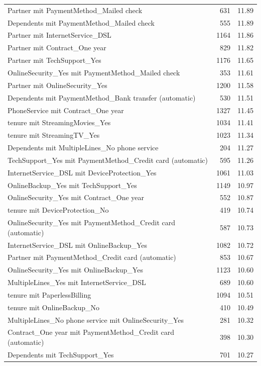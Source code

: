 \documentclass[a4paper,11pt]{article}
\begin{document}
\begin{longtable}{p{9cm}rr}
Partner mit PaymentMethod\_Mailed check & 631 & 11.89 \\
Dependents mit PaymentMethod\_Mailed check & 555 & 11.89 \\
Partner mit InternetService\_DSL & 1164 & 11.86 \\
Partner mit Contract\_One year & 829 & 11.82 \\
Partner mit TechSupport\_Yes & 1176 & 11.65 \\
OnlineSecurity\_Yes mit PaymentMethod\_Mailed check & 353 & 11.61 \\
Partner mit OnlineSecurity\_Yes & 1200 & 11.58 \\
Dependents mit PaymentMethod\_Bank transfer (automatic) & 530 & 11.51 \\
PhoneService mit Contract\_One year & 1327 & 11.45 \\
tenure mit StreamingMovies\_Yes & 1034 & 11.41 \\
tenure mit StreamingTV\_Yes & 1023 & 11.34 \\
Dependents mit MultipleLines\_No phone service & 204 & 11.27 \\
TechSupport\_Yes mit PaymentMethod\_Credit card (automatic) & 595 & 11.26 \\
InternetService\_DSL mit DeviceProtection\_Yes & 1061 & 11.03 \\
OnlineBackup\_Yes mit TechSupport\_Yes & 1149 & 10.97 \\
OnlineSecurity\_Yes mit Contract\_One year & 552 & 10.87 \\
tenure mit DeviceProtection\_No & 419 & 10.74 \\
OnlineSecurity\_Yes mit PaymentMethod\_Credit card (automatic) & 587 & 10.73 \\
InternetService\_DSL mit OnlineBackup\_Yes & 1082 & 10.72 \\
Partner mit PaymentMethod\_Credit card (automatic) & 853 & 10.67 \\
OnlineSecurity\_Yes mit OnlineBackup\_Yes & 1123 & 10.60 \\
MultipleLines\_Yes mit InternetService\_DSL & 689 & 10.60 \\
tenure mit PaperlessBilling & 1094 & 10.51 \\
tenure mit OnlineBackup\_No & 410 & 10.49 \\
MultipleLines\_No phone service mit OnlineSecurity\_Yes & 281 & 10.32 \\
Contract\_One year mit PaymentMethod\_Credit card (automatic) & 398 & 10.30 \\
Dependents mit TechSupport\_Yes & 701 & 10.27 \\

\end{longtable}
\end{document}
